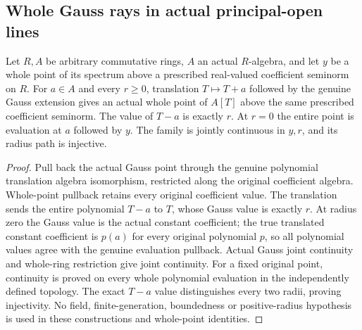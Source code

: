 \subsection{Whole Gauss rays in actual principal-open lines}
\label{subsec:line-gauss-paths}

\begin{theorem}
\label{spectrum:centered-gauss-whole-ray}
\leanok
{}
Let $R,A$ be arbitrary commutative rings, $A$ an actual $R$-algebra,
and let $y$ be a whole point of its spectrum above a prescribed
real-valued coefficient seminorm on $R$. For $a\in A$ and every
$r\ge0$, translation $T\mapsto T+a$ followed by the genuine Gauss
extension gives an actual whole point of $A[T]$ above the same
prescribed coefficient seminorm. The value of $T-a$ is exactly $r$.
At $r=0$ the entire point is evaluation at $a$ followed by $y$.
The family is jointly continuous in $y,r$, and its radius path is injective.
\end{theorem}
\begin{proof}
Pull back the actual Gauss point through the genuine polynomial
translation algebra isomorphism, restricted along the original
coefficient algebra. Whole-point pullback retains every original
coefficient value. The translation sends the entire polynomial $T-a$
to $T$, whose Gauss value is exactly $r$. At radius zero the Gauss
value is the actual constant coefficient; the true translated constant
coefficient is $p(a)$ for every original polynomial $p$, so all
polynomial values agree with the genuine evaluation pullback.
Actual Gauss joint continuity and whole-ring restriction give joint
continuity. For a fixed original point, continuity is proved on every
whole polynomial evaluation in the independently defined topology.
The exact $T-a$ value distinguishes every two radii, proving injectivity.
No field, finite-generation, boundedness or positive-radius hypothesis
is used in these constructions and whole-point identities.
\end{proof}

